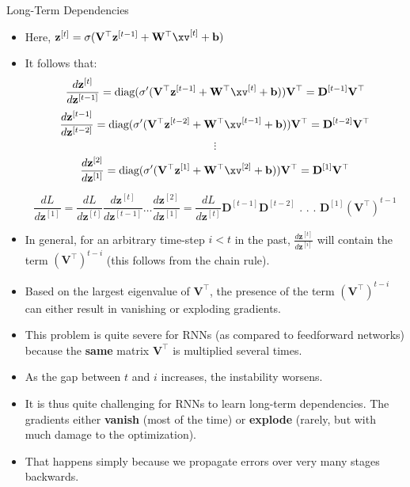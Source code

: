 \documentclass[11pt,compress,t,notes=noshow, xcolor=table]{beamer}
\begin{document}
\begin{vbframe}{Long-Term Dependencies}
  
  \begin{itemize}
    \item Here, $\mathbf{z}^{[t]} = \sigma(\mathbf{V}^\top \mathbf{z}^{[t-1]} + \mathbf{W}^\top \xv^{[t]} + \mathbf{b})$
    \item It follows that:
    $$ \frac{d \mathbf{z}^{[t]}}{d\mathbf{z}^{[t-1]}} = \text{diag}(\sigma' (\mathbf{V}^\top \mathbf{z}^{[t-1]} + \mathbf{W}^\top \xv^{[t]} + \mathbf{b})) \mathbf{V}^\top = \mathbf{D}^{[t-1]} \mathbf{V}^\top $$
    $$ \frac{d \mathbf{z}^{[t-1]}}{d\mathbf{z}^{[t-2]}} = \text{diag}(\sigma' (\mathbf{V}^\top \mathbf{z}^{[t-2]} + \mathbf{W}^\top \xv^{[t-1]} + \mathbf{b})) \mathbf{V}^\top= \mathbf{D}^{[t-2]} \mathbf{V}^\top $$
    $$ \vdots $$
    $$ \frac{d \mathbf{z}^{[2]}}{d\mathbf{z}^{[1]}} = \text{diag}(\sigma' (\mathbf{V}^\top \mathbf{z}^{[1]} + \mathbf{W}^\top \xv^{[2]} + \mathbf{b})) \mathbf{V}^\top = \mathbf{D}^{[1]} \mathbf{V}^\top $$
    
    $$ \frac{d L}{d \mathbf{z}^{[1]}} = \frac{d L}{d \mathbf{z}^{[t]}} \frac{d \mathbf{z}^{[t]}}{d \mathbf{z}^{[t-1]}} \dots \frac{d \mathbf{z}^{[2]}}{d \mathbf{z}^{[1]}} = \frac{d L}{d \mathbf{z}^{[t]}} \mathbf{D}^{[t-1]} \mathbf{D}^{[t-2]}   \text{ . . . } \mathbf{D}^{[1]} (\mathbf{V}^\top)^{t-1}$$
    \item In general, for an arbitrary time-step $i<t$ in the past, $\frac{d\mathbf{z}^{[t]}}{d\mathbf{z}^{[i]}}$ will contain the term $(\mathbf{V}^\top)^{t-i}$ (this follows from the chain rule).
    \item Based on the largest eigenvalue of $\mathbf{V}^\top$, the presence of the term $(\mathbf{V}^\top)^{t-i}$ can either result in vanishing or exploding gradients.
    \item This problem is quite severe for RNNs (as compared to feedforward networks) because the \textbf{same} matrix $\mathbf{V}^\top$ is multiplied several times. \href{https://tinyurl.com/vangrad}{}
    \item As the gap between $t$ and $i$ increases, the instability worsens.
    \item It is thus quite challenging for RNNs to learn long-term dependencies. The gradients either \textbf{vanish} (most of the time) or \textbf{explode} (rarely, but with much damage to the optimization).
    \item That happens simply because we propagate errors over very many stages backwards.
  \end{itemize}
  

\end{vbframe}
\end{document}

